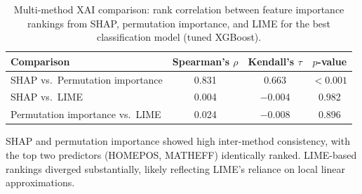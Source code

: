 \begin{table}[htp]
\centering
\caption{Multi-method XAI comparison: rank correlation between feature importance rankings from SHAP, permutation importance, and LIME for the best classification model (tuned XGBoost).}
\label{tab:xai-comparison}
\begin{tabular}{lccc}
\toprule
Comparison & Spearman's $\rho$ & Kendall's $\tau$ & $p$-value \\
\midrule
SHAP vs.\ Permutation importance & 0.831 & 0.663 & $<0.001$ \\
SHAP vs.\ LIME & 0.004 & $-$0.004 & 0.982 \\
Permutation importance vs.\ LIME & 0.024 & $-$0.008 & 0.896 \\
\bottomrule
\end{tabular}

\par\small SHAP and permutation importance showed high inter-method consistency, with the top two predictors (HOMEPOS, MATHEFF) identically ranked. LIME-based rankings diverged substantially, likely reflecting LIME's reliance on local linear approximations.
\end{table}
